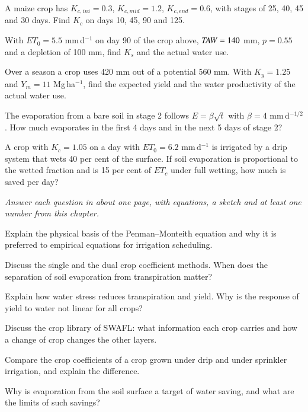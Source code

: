 \begin{exlist}
\item A maize crop has $K_{c,ini}=0.3$, $K_{c,mid}=1.2$, $K_{c,end}=0.6$, with stages of 25, 40, 45 and 30 days. Find $K_c$ on days 10, 45, 90 and 125.
\item With $ET_0=5.5$ mm\,d$^{-1}$ on day 90 of the crop above, $\mathit{TAW}=140$ mm, $p=0.55$ and a depletion of 100 mm, find $K_s$ and the actual water use.
\item Over a season a crop uses 420 mm out of a potential 560 mm. With $K_y=1.25$ and $Y_m=11$ Mg\,ha$^{-1}$, find the expected yield and the water productivity of the actual water use.
\item The evaporation from a bare soil in stage 2 follows $E=\beta\sqrt t$ with $\beta=4$ mm\,d$^{-1/2}$. How much evaporates in the first 4 days and in the next 5 days of stage 2?\exans{8 mm; 4 mm}
\item A crop with $K_c=1.05$ on a day with $ET_0=6.2$ mm\,d$^{-1}$ is irrigated by a drip system that wets 40 per cent of the surface. If soil evaporation is proportional to the wetted fraction and is 15 per cent of $ET_c$ under full wetting, how much is saved per day?\exans{0.59 mm}
\end{exlist}
{\small\itshape Answer each question in about one page, with equations, a sketch and at least one number from this chapter.}\par\vspace{3pt}
\begin{exlist}
\item Explain the physical basis of the Penman--Monteith equation and why it is preferred to empirical equations for irrigation scheduling.
\item Discuss the single and the dual crop coefficient methods. When does the separation of soil evaporation from transpiration matter?
\item Explain how water stress reduces transpiration and yield. Why is the response of yield to water not linear for all crops?
\item Discuss the crop library of SWAFL: what information each crop carries and how a change of crop changes the other layers.
\item Compare the crop coefficients of a crop grown under drip and under sprinkler irrigation, and explain the difference.
\item Why is evaporation from the soil surface a target of water saving, and what are the limits of such savings?
\end{exlist}
